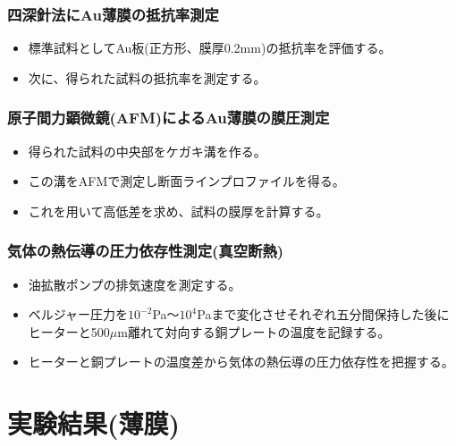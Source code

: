\documentclass{jsarticle}
\begin{document}
\subsubsection{四深針法にAu薄膜の抵抗率測定}
\begin{itemize}
\item 標準試料としてAu板(正方形、膜厚0.2mm)の抵抗率を評価する。
\item 次に、得られた試料の抵抗率を測定する。
\end{itemize}
\subsubsection{原子間力顕微鏡(AFM)によるAu薄膜の膜圧測定}
\begin{itemize}
\item 得られた試料の中央部をケガキ溝を作る。
\item この溝をAFMで測定し断面ラインプロファイルを得る。
\item これを用いて高低差を求め、試料の膜厚を計算する。
\end{itemize}
\subsubsection{気体の熱伝導の圧力依存性測定(真空断熱)}
\begin{itemize}
\item 油拡散ポンプの排気速度を測定する。
\item ベルジャー圧力を$10^{-2}$Pa〜$10^{4}$Paまで変化させそれぞれ五分間保持した後にヒーターと500$\mu$m離れて対向する銅プレートの温度を記録する。
\item ヒーターと銅プレートの温度差から気体の熱伝導の圧力依存性を把握する。
\end{itemize}
\section{実験結果(薄膜)}
\end{document}
